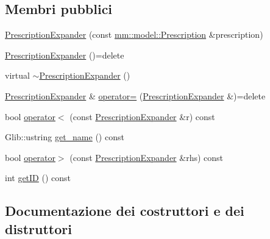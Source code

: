 \subsection*{Membri pubblici}
\begin{DoxyCompactItemize}
\item 
\mbox{\hyperlink{classmm_1_1view_1_1_prescription_expander_a12b5e974972ebdd42478c59c08e3f219}{Prescription\+Expander}} (const \mbox{\hyperlink{classmm_1_1model_1_1_prescription}{mm\+::model\+::\+Prescription}} \&prescription)
\item 
\mbox{\hyperlink{classmm_1_1view_1_1_prescription_expander_ac39b2410139956ef3f707caf1b23dc26}{Prescription\+Expander}} ()=delete
\item 
virtual \mbox{\hyperlink{classmm_1_1view_1_1_prescription_expander_a8011da18b2ee9bf91ca672813c6c4e27}{$\sim$\+Prescription\+Expander}} ()
\item 
\mbox{\hyperlink{classmm_1_1view_1_1_prescription_expander}{Prescription\+Expander}} \& \mbox{\hyperlink{classmm_1_1view_1_1_prescription_expander_a21d6e2894f4c17fc279510f4fadd8eff}{operator=}} (\mbox{\hyperlink{classmm_1_1view_1_1_prescription_expander}{Prescription\+Expander}} \&)=delete
\item 
bool \mbox{\hyperlink{classmm_1_1view_1_1_prescription_expander_a761cc50a6326cc40496a9346a872e734}{operator$<$}} (const \mbox{\hyperlink{classmm_1_1view_1_1_prescription_expander}{Prescription\+Expander}} \&r) const
\item 
Glib\+::ustring \mbox{\hyperlink{classmm_1_1view_1_1_prescription_expander_aff3761ec2d61ceeb5871e21a39a35bdb}{get\+\_\+name}} () const
\item 
bool \mbox{\hyperlink{classmm_1_1view_1_1_prescription_expander_a3604c2f026067d71ff619036a9615694}{operator$>$}} (const \mbox{\hyperlink{classmm_1_1view_1_1_prescription_expander}{Prescription\+Expander}} \&rhs) const
\item 
int \mbox{\hyperlink{classmm_1_1view_1_1_prescription_expander_a63f5113e028e8d9e7eb09981dc28e602}{get\+ID}} () const
\end{DoxyCompactItemize}


\subsection{Documentazione dei costruttori e dei distruttori}
\mbox{\label{classmm_1_1view_1_1_prescription_expander_a12b5e974972ebdd42478c59c08e3f219}} 
